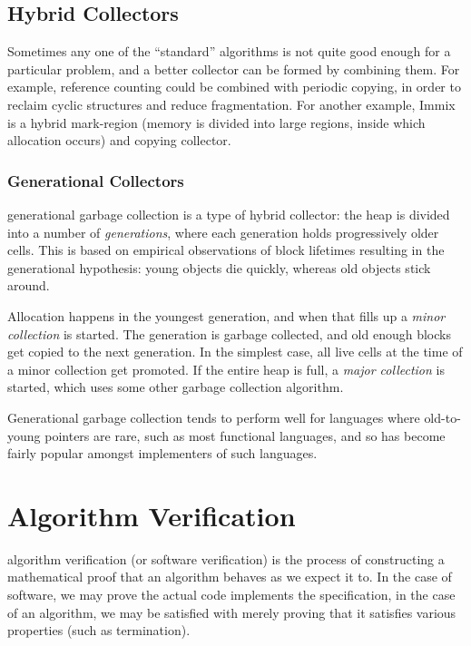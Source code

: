 \subsection{Hybrid Collectors}
\label{sec:lit-gc-hybrid}

Sometimes any one of the ``standard'' algorithms is not quite good
enough for a particular problem, and a better collector can be formed
by combining them. For example, reference counting could be combined
with periodic copying, in order to reclaim cyclic structures and
reduce fragmentation. For another example, Immix\cite{Blackburn08} is
a hybrid mark-region (memory is divided into large regions, inside
which allocation occurs) and copying collector.

\subsubsection{Generational Collectors}
\label{sec:lit-gc-hybrid-generational}

\Gls{generational garbage collection} is a type of \gls{hybrid
  collector}: the heap is divided into a number of
\textit{generations}, where each generation holds progressively older
\glspl{cell}. This is based on empirical observations of block
lifetimes resulting in the generational hypothesis: young objects die
quickly, whereas old objects stick around\cite{Ungar84}.

Allocation happens in the youngest generation, and when that fills up
a \textit{minor collection} is started. The generation is garbage
collected, and old enough blocks get copied to the next generation. In
the simplest case, all \glspl{live cell} at the time of a minor
collection get promoted. If the entire heap is full, a \textit{major
  collection} is started, which uses some other garbage collection
algorithm\cite{GarbageCollection}.

Generational garbage collection tends to perform well for languages
where \glspl{old-to-young pointer} are rare, such as most functional
languages, and so has become fairly popular amongst implementers of
such languages.

\section{Algorithm Verification}
\label{sec:lit-verification}

\Gls{algorithm verification} (or software verification) is the process
of constructing a mathematical proof that an algorithm behaves as we
expect it to. In the case of software, we may prove the actual code
implements the specification, in the case of an algorithm, we may be
satisfied with merely proving that it satisfies various properties
(such as termination).

